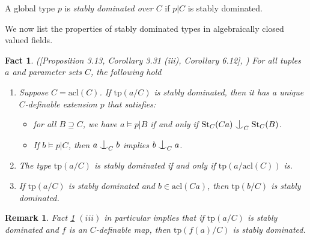 \documentclass[12pt]{article}
\newcommand{\tpp}{\mathrm{tp}}
\newcommand{\ACVF}{\mathrm{ACVF}}
\newcommand{\acl}{\mathrm{acl}}
\newcommand{\st}{\mathrm{St}}
\newcommand{\0}{\emptyset}
\def\forkindep{\mathrel{\raise0.2ex\hbox{\ooalign{\hidewidth$\vert$\hidewidth\cr\raise-0.9ex\hbox{$\smile$}}}}}
\theoremstyle{plain}%
\newtheorem{rem}[thm]{Remark}
\newtheorem{fact}[thm]{Fact}
\theoremstyle{definition}
\theoremstyle{remark}
\begin{document}
A global type $p$ is \textit{stably dominated over $C$} if $p|C$ is stably dominated.

We now list the properties of stably dominated types in algebraically closed valued fields. 

\begin{fact}\label{stabdom_acl_properties}([Proposition 3.13, Corollary 3.31 (iii), Corollary 6.12]\cite{HHM08}, \cite[Proposition 2.10 (1)]{HR19} ) For all tuples $a$ and parameter sets $C$, the following hold
\begin{enumerate} 
    \item[(i)] Suppose $C=\acl(C)$. If $\tpp(a/C)$ is stably dominated, then it has a unique $C$-definable extension $p$ that satisfies: 
    \begin{itemize}
    \item for all $B\supseteq C$, we have $a\models p|B$ if and only if $\st_C(Ca)\forkindep_C \st_C(B)$.
    \item If $b \models p|C$, then $a \forkindep_C b$ implies $b \forkindep_C a$.
    \end{itemize}
    \item[(ii)] The type $\tpp(a/C)$ is stably dominated if and only if $\tpp(a/\acl(C))$ is.
   \item[(iii)] If $\tpp(a/C)$ is stably dominated and $b\in \acl(Ca)$, then $\tpp(b/C)$ is stably dominated.

\end{enumerate}
\end{fact}


\begin{rem}\label{pushforward_stabdom}
   Fact \ref{stabdom_acl_properties} $(iii)$ in particular implies that if $\tpp(a/C)$ is stably dominated and $f$ is an $C$-definable map, then $\tpp(f(a)/C)$ is stably dominated.
\end{rem}
\end{document}
